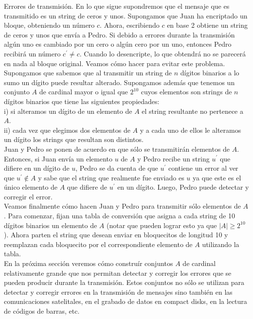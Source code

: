 \documentclass[10pt]{article}
\begin{document}
Errores de transmisión. En lo que sigue supondremos que el mensaje que es transmitido es un string de ceros y unos. Supongamos que Juan ha encriptado un bloque, obteniendo un número $c$. Ahora, escribiendo $c$ en base 2 obtiene un string de ceros y unos que envía a Pedro. Si debido a errores durante la transmisión algún uno es cambiado por un cero o algún cero por un uno, entonces Pedro recibirá un número $c^{\prime} \neq c$. Cuando lo desencripte, lo que obtendrá no se parecerá en nada al bloque original. Veamos cómo hacer para evitar este problema.\\
Supongamos que sabemos que al transmitir un string de $n$ dígitos binarios a lo sumo un dígito puede resultar alterado. Supongamos además que tenemos un conjunto $A$ de cardinal mayor o igual que $2^{10}$ cuyos elementos son strings de $n$ dígitos binarios que tiene las siguientes propiedades:\\
i) si alteramos un dígito de un elemento de $A$ el string resultante no pertenece a $A$.\\
ii) cada vez que elegimos dos elementos de $A$ y a cada uno de ellos le alteramos un dígito los strings que resultan son distintos.\\
Juan y Pedro se ponen de acuerdo en que sólo se transmitirán elementos de $A$. Entonces, si Juan envía un elemento $u$ de $A$ y Pedro recibe un string $u^{\prime}$ que difiere en un dígito de $u$, Pedro se da cuenta de que $u^{\prime}$ contiene un error al ver que $u^{\prime} \notin A$ y sabe que el string que realmente fue enviado es $u$ ya que este es el único elemento de $A$ que difiere de $u^{\prime}$ en un dígito. Luego, Pedro puede detectar y corregir el error.\\
Veamos finalmente cómo hacen Juan y Pedro para transmitir sólo elementos de $A$. Para comenzar, fijan una tabla de conversión que asigna a cada string de 10 dígitos binarios un elemento de $A$ (notar que pueden lograr esto ya que $|A| \geq 2^{10}$ ). Ahora parten el string que desean enviar en bloquecitos de longitud 10 y reemplazan cada bloquecito por el correspondiente elemento de $A$ utilizando la tabla.\\
En la próxima sección veremos cómo construír conjuntos $A$ de cardinal relativamente grande que nos permitan detectar y corregir los errores que se pueden producir durante la transmisión. Estos conjuntos no sólo se utilizan para detectar y corregir errores en la transmisión de mensajes sino también en las comunicaciones satelitales, en el grabado de datos en compact disks, en la lectura de códigos de barras, etc.
\end{document}
